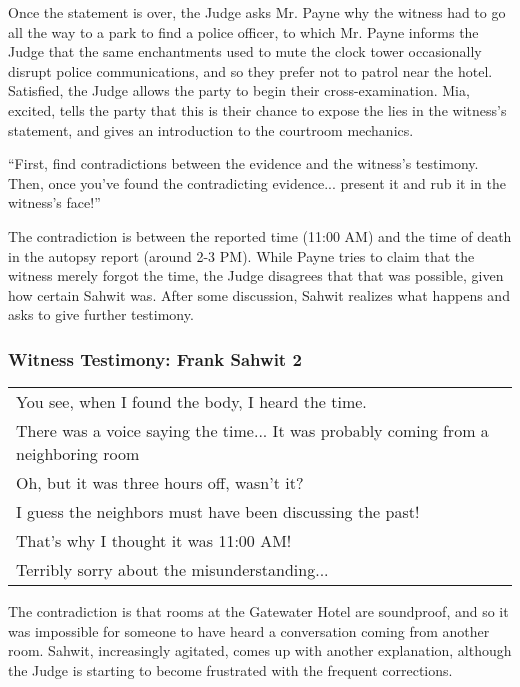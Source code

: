 Once the statement is over, the Judge asks Mr. Payne why the witness had to go all the way to a park to find a police officer, to which Mr. Payne informs the Judge that the same enchantments used to mute the clock tower occasionally disrupt police communications, and so they prefer not to patrol near the hotel. Satisfied, the Judge allows the party to begin their cross-examination. Mia, excited, tells the party that this is their chance to expose the lies in the witness's statement, and gives an introduction to the courtroom mechanics.

\begin{center}
``First, find contradictions between the evidence and the witness's testimony. Then, once you've found the contradicting evidence... present it and rub it in the witness's face!''
\end{center}

The contradiction is between the reported time (11:00 AM) and the time of death in the autopsy report (around 2-3 PM). While Payne tries to claim that the witness merely forgot the time, the Judge disagrees that that was possible, given how certain Sahwit was. After some discussion, Sahwit realizes what happens and asks to give further testimony.

\subsubsection{Witness Testimony: Frank Sahwit 2}
\begin{center}
\begin{tabular}{p{4in}}
You see, when I found the body, I heard the time. \\
There was a voice saying the time... It was probably coming from a neighboring room \\
Oh, but it was three hours off, wasn't it? \\
I guess the neighbors must have been discussing the past! \\
That's why I thought it was 11:00 AM! \\
Terribly sorry about the misunderstanding...
\end{tabular}
\end{center}

The contradiction is that rooms at the Gatewater Hotel are soundproof, and so it was impossible for someone to have heard a conversation coming from another room. Sahwit, increasingly agitated, comes up with another explanation, although the Judge is starting to become frustrated with the frequent corrections. \\

